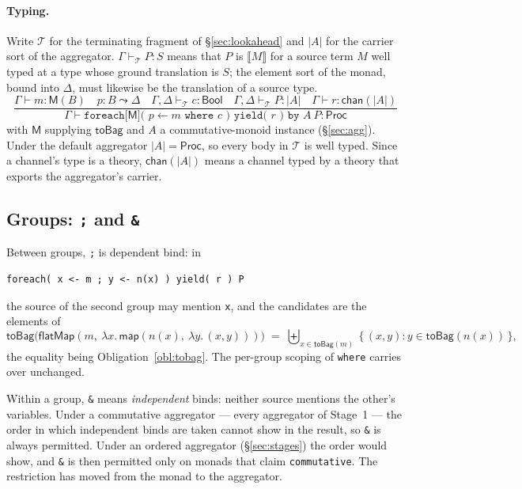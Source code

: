 \documentclass[11pt]{article}
\theoremstyle{branddef}
\theoremstyle{brandplain}
\theoremstyle{brandrem}
\newcommand{\sem}[1]{\llbracket #1 \rrbracket}
\newcommand{\Proc}{\mathsf{Proc}}
\newcommand{\M}{\mathsf{M}}
\newcommand{\fmap}{\mathsf{map}}
\newcommand{\bind}{\mathsf{flatMap}}
\begin{document}
\paragraph{Typing.} Write \(\mathcal{T}\) for the terminating fragment of
\S\ref{sec:lookahead} and \(|A|\) for the carrier sort of the aggregator.
\(\Gamma \vdash_{\mathcal{T}} P : S\) means that \(P\) is \(\sem{M}\) for a
source term \(M\) well typed at a type whose ground translation is \(S\); the
element sort of the monad, bound into \(\Delta\), must likewise be the
translation of a source type.
\[
\frac{
\Gamma \vdash m : \M(B) \quad
p : B \leadsto \Delta \quad
\Gamma,\Delta \vdash_{\mathcal{T}} c : \textsf{Bool} \quad
\Gamma,\Delta \vdash_{\mathcal{T}} P : |A| \quad
\Gamma \vdash r : \textsf{chan}(|A|)
}{
\Gamma \vdash \texttt{foreach[}\M\texttt{]( } p \leftarrow m \texttt{ where } c \texttt{ ) yield( } r \texttt{ ) by } A\ P : \Proc
}
\]
with \(\M\) supplying \(\mathsf{toBag}\) and \(A\) a commutative-monoid
instance (\S\ref{sec:agg}). Under the default aggregator \(|A| = \Proc\), so
every body in \(\mathcal{T}\) is well typed. Since a channel's type is a
theory, \(\textsf{chan}(|A|)\) means a channel typed by a theory that exports
the aggregator's carrier.

\subsection{Groups: \texttt{;} and \texttt{\&}}
\label{sec:groups}

Between groups, \texttt{;} is dependent bind: in
\begin{lstlisting}
foreach( x <- m ; y <- n(x) ) yield( r ) P
\end{lstlisting}
the source of the second group may mention \texttt{x}, and the candidates are
the elements of
\[
\mathsf{toBag}\big(\bind(m,\ \lambda x.\,\fmap(n(x),\ \lambda y.\,(x,y)))\big)
\;=\;
\textstyle\biguplus_{x \in \mathsf{toBag}(m)}\ \{\, (x,y) : y \in \mathsf{toBag}(n(x)) \,\},
\]
the equality being Obligation~\ref{obl:tobag}. The per-group scoping of
\texttt{where} carries over unchanged.

Within a group, \texttt{\&} means \emph{independent} binds: neither source
mentions the other's variables. Under a commutative aggregator --- every
aggregator of Stage~1 --- the order in which independent binds are taken cannot
show in the result, so \texttt{\&} is always permitted. Under an ordered
aggregator (\S\ref{sec:stages}) the order would show, and \texttt{\&} is then
permitted only on monads that claim \texttt{commutative}. The restriction has
moved from the monad to the aggregator.
\end{document}
